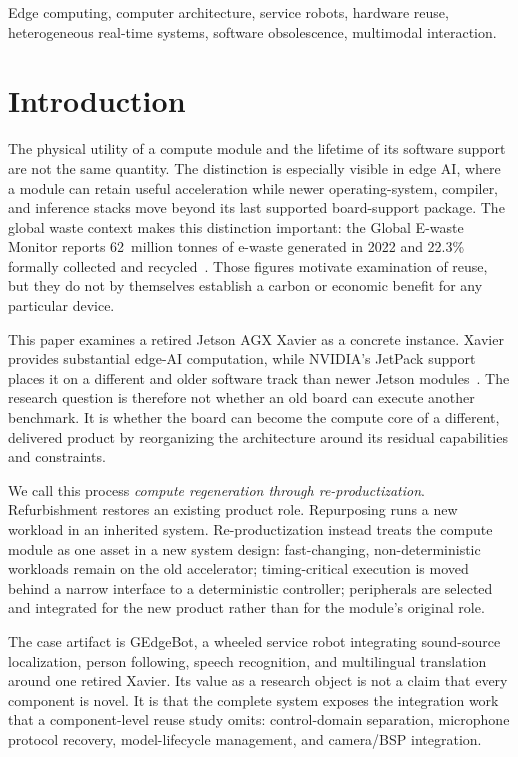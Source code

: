 \documentclass[conference]{IEEEtran}
\begin{document}
\begin{abstract}
\end{abstract}

\begin{IEEEkeywords}
Edge computing, computer architecture, service robots, hardware reuse, heterogeneous real-time systems, software obsolescence, multimodal interaction.
\end{IEEEkeywords}

\section{Introduction}
The physical utility of a compute module and the lifetime of its software support are not the same quantity. The distinction is especially visible in edge AI, where a module can retain useful acceleration while newer operating-system, compiler, and inference stacks move beyond its last supported board-support package. The global waste context makes this distinction important: the Global E-waste Monitor reports 62~million tonnes of e-waste generated in 2022 and 22.3\% formally collected and recycled~\cite{global_ewaste_monitor_2024}. Those figures motivate examination of reuse, but they do not by themselves establish a carbon or economic benefit for any particular device.

This paper examines a retired Jetson AGX Xavier as a concrete instance. Xavier provides substantial edge-AI computation, while NVIDIA's JetPack support places it on a different and older software track than newer Jetson modules~\cite{nvidia_jetson_agx_xavier,nvidia_jetpack_5,nvidia_jetpack_6}. The research question is therefore not whether an old board can execute another benchmark. It is whether the board can become the compute core of a different, delivered product by reorganizing the architecture around its residual capabilities and constraints.

We call this process \emph{compute regeneration through re-productization}. Refurbishment restores an existing product role. Repurposing runs a new workload in an inherited system. Re-productization instead treats the compute module as one asset in a new system design: fast-changing, non-deterministic workloads remain on the old accelerator; timing-critical execution is moved behind a narrow interface to a deterministic controller; peripherals are selected and integrated for the new product rather than for the module's original role.

The case artifact is GEdgeBot, a wheeled service robot integrating sound-source localization, person following, speech recognition, and multilingual translation around one retired Xavier. Its value as a research object is not a claim that every component is novel. It is that the complete system exposes the integration work that a component-level reuse study omits: control-domain separation, microphone protocol recovery, model-lifecycle management, and camera/BSP integration.
\end{document}
